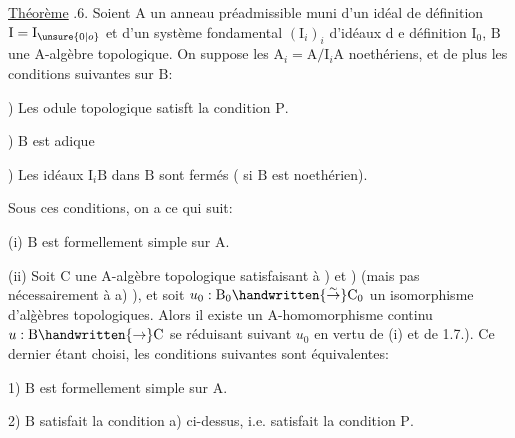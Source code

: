 
\uline{Théorème} .6. Soient $\mathrm A$ un anneau préadmissible muni d'un idéal de définition $\mathrm I=\mathrm I_{\unsure{0|o}}$ et d'un système fondamental $(\mathrm I_i)_i$ d'idéaux d e définition $\mathrm I_0$, $\mathrm B$ une $\mathrm A$-algèbre topologique. On suppose les $\mathrm A_i=\mathrm A/\mathrm I_i\mathrm A$ noethériens, et de plus les conditions suivantes sur $\mathrm B$:

) Les odule topologique    satisft la condition $\mathrm P$.


) $\mathrm B$ est adique 

) Les idéaux $\mathrm I_i\mathrm B$ dans $\mathrm B$ sont fermés ( si $\mathrm B$ est noethérien).

Sous ces conditions, on a ce qui suit:

(i) $\mathrm B$ est formellement simple sur $\mathrm A$.

(ii) Soit $\mathrm C$ une $\mathrm A$-algèbre topologique satisfaisant à ) et ) (mais pas nécessairement à a) ), et soit $u_0:\mathrm B_0\handwritten{\overset{\sim}{\to}}\mathrm C_0$ un isomorphisme d'al\`{g}èbres topologiques. Alors il existe un $\mathrm A$-homomorphisme continu $u:\mathrm B\handwritten{\to}\mathrm C$ se réduisant suivant $u_0$ \handwritten{(}en vertu de (i) et de 1.7.). Ce dernier étant choisi, les conditions suivantes sont équivalentes: 

1) $\mathrm B$ est formellement simple sur $\mathrm A$.

2)  $\mathrm B$ satisfait la condition a) ci-dessus, i.e.  satisfait la condition $\mathrm P$.

